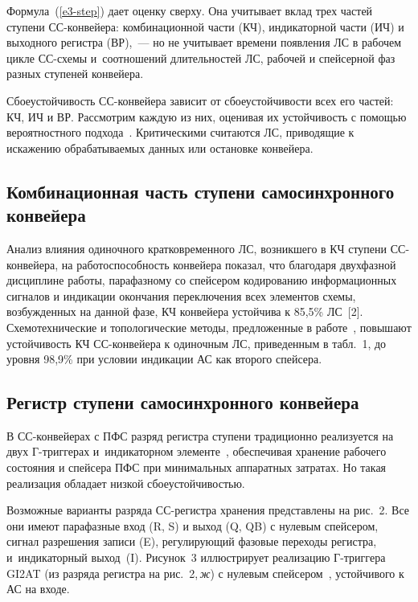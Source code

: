 \begin{multicols}{2}
  
  Формула~(\ref{e3-step}) дает оценку сверху. Она учитывает вклад трех 
частей ступени 
  СС-кон\-вей\-ера: комбинационной части (КЧ), индикаторной части (ИЧ) и 
выходного регистра (ВР),~--- но не учитывает времени появления ЛС в 
рабочем цикле СС-схе\-мы и~соотношений длительностей ЛС, рабочей и 
спейсерной фаз разных ступеней конвейера.
  
  Сбоеустойчивость СС-конвейера зависит от сбоеустойчивости всех его 
частей: КЧ, ИЧ и ВР. Рассмотрим каждую из них, оценивая их устойчивость с 
помощью вероятностного подхода~\cite{2-step}. Критическими считаются 
ЛС, приводящие к искажению обрабатываемых данных или остановке 
конвейера.

\vspace*{-4pt}

\subsection{Комбинационная часть ступени самосинхронного конвейера}

  Анализ влияния одиночного кратковременного ЛС, возникшего в КЧ 
ступени 
  СС-кон\-вей\-ера, на работоспособность конвейера показал, что благодаря 
двухфазной дисциплине работы, парафазному со спейсером кодированию 
информационных сигналов и индикации окончания переключения всех 
элементов схемы, возбужденных на данной фазе, КЧ конвейера устойчива к 
85,5\% ЛС~[2]. Схемотехнические и топологические методы, предложенные в 
работе~\cite{2-step}, повышают устойчивость КЧ 
  СС-кон\-вей\-ера к одиночным ЛС, приведенным в табл.~1, до уровня 
98,9\% при условии индикации АС как второго спейсера. 

\vspace*{-4pt}
  
\subsection{Регистр ступени самосинхронного конвейера}
  
  В СС-конвейерах с ПФС разряд регистра ступени традиционно реализуется 
на двух 
  Г-триг\-ге\-рах и~индикаторном элементе~\cite{4-step}, обеспечивая 
хранение рабочего состояния и спейсера ПФС при минимальных аппаратных 
затратах. Но такая реализация обладает низкой сбоеустойчивостью.
  
  Возможные варианты разряда СС-ре\-гист\-ра хранения представлены на 
рис.~2. Все они имеют парафазные вход (R, S) и 
выход (Q, QB) с нулевым спейсером, сигнал разрешения записи (E), 
регулирующий фазовые переходы регистра, и~индикаторный выход~(I). 
Рисунок~3 иллюстрирует реализацию Г-триг\-ге\-ра GI2AT (из разряда 
регистра на рис.~2,\,\textit{ж}) с нулевым спейсером~\cite{5-step}, 
устойчивого к АС на \mbox{входе}. 
  

\end{multicols}
